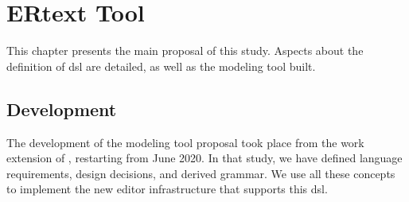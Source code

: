 \chapter{ERtext Tool} \label{chap:ERtext}

This chapter presents the main proposal of this study.
Aspects about the definition of \ac{dsl} are detailed, as well as the modeling tool built.

\section{Development} \label{sec_tool:development}

The development of the modeling tool proposal took place from the work extension of \cite{Lopes:2019}, restarting from June 2020.
In that study, we have defined language requirements, design decisions, and derived grammar.
We use all these concepts to implement the new editor infrastructure that supports this \ac{dsl}.

